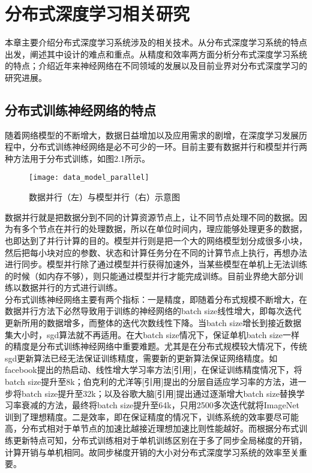 \chapter{分布式深度学习相关研究}
本章主要介绍分布式深度学习系统涉及的相关技术。从分布式深度学习系统的特点出发，阐述其中设计的难点和重点。从精度和效率两方面分析分布式深度学习系统的特点；介绍近年来神经网络在不同领域的发展以及目前业界对分布式深度学习的研究进展。
\section{分布式训练神经网络的特点}
随着网络模型的不断增大，数据日益增加以及应用需求的剧增，在深度学习发展历程中，分布式训练神经网络是必不可少的一环。目前主要有数据并行和模型并行两种方法用于分布式训练，如图2.1所示。\\
\begin{figure}[htp]
\centering
\texttt{[image: data\_model\_parallel]}
\caption{数据并行（左）与模型并行（右）示意图}
\end{figure}
数据并行就是把数据分到不同的计算资源节点上，让不同节点处理不同的数据。因为有多个节点在并行的处理数据，所以在单位时间内，理应能够处理更多的数据，也即达到了并行计算的目的。模型并行则是把一个大的网络模型划分成很多小块，然后把每小块对应的参数、状态和计算任务分在不同的计算节点上执行，再想办法进行同步。模型并行除了通过模型并行获得加速外，当某些模型在单机上无法训练的时候（如内存不够），则只能通过模型并行才能完成训练。目前业界绝大部分训练以数据并行的方式进行训练。\\
分布式训练神经网络主要有两个指标：一是精度，即随着分布式规模不断增大，在数据并行方法下必然导致用于训练的神经网络的batch size线性增大，即每次迭代更新所用的数据增多，而整体的迭代次数线性下降。当batch size增长到接近数据集大小时，sgd算法就不再适用。在大batch size情况下，保证单机batch size一样的精度是分布式训练神经网络中重要难题。尤其是在分布式规模较大情况下，传统sgd更新算法已经无法保证训练精度，需要新的更新算法保证网络精度。如facebook提出的热启动、线性增大学习率方法[引用]，在保证训练精度情况下，将batch size提升至8k；伯克利的尤洋等[引用]提出的分层自适应学习率的方法，进一步将batch size提升至32k；以及谷歌大脑[引用]提出通过逐渐增大batch size替换学习率衰减的方法，最终将batch size提升至64k，只用2500多次迭代就将ImageNet训到了理想精度。二是效率，即在保证精度的情况下，训练系统的效率要尽可能高，分布式相对于单节点的加速比越接近理想加速比则性能越好。而根据分布式训练更新特点可知，分布式训练相对于单机训练区别在于多了同步全局梯度的开销，计算开销与单机相同。故同步梯度开销的大小对分布式深度学习系统的效率至关重要。\\
